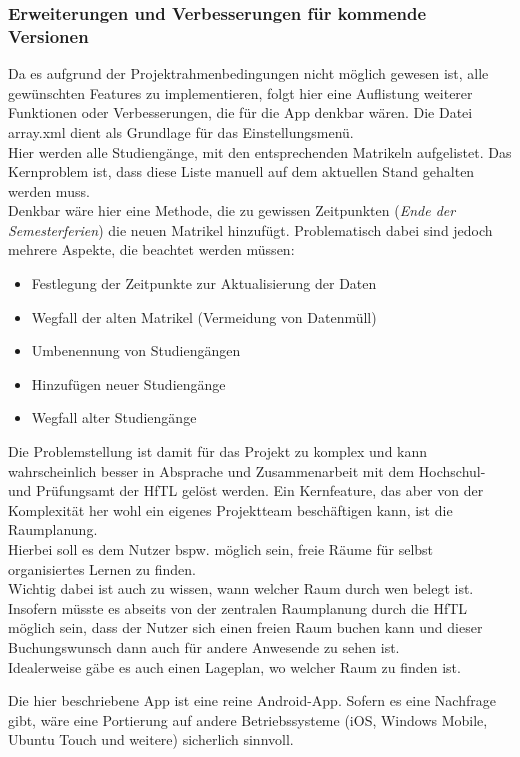 \begin{description}
\subsubsection{Erweiterungen und Verbesserungen für kommende Versionen}
Da es aufgrund der Projektrahmenbedingungen nicht möglich gewesen ist, alle gewünschten Features zu implementieren, folgt hier eine Auflistung weiterer Funktionen oder Verbesserungen, die für die App denkbar wären.
\label{pflege}
Die Datei array.xml dient als Grundlage für das Einstellungsmenü.\\
Hier werden alle Studiengänge, mit den entsprechenden Matrikeln aufgelistet. Das Kernproblem ist, dass diese Liste manuell auf dem aktuellen Stand gehalten werden muss.\\
Denkbar wäre hier eine Methode, die zu gewissen Zeitpunkten (\textit{Ende der Semesterferien}) die neuen Matrikel hinzufügt. Problematisch dabei sind jedoch mehrere Aspekte, die beachtet werden müssen:
\begin{itemize}
\item Festlegung der Zeitpunkte zur Aktualisierung der Daten
\item Wegfall der alten Matrikel (Vermeidung von Datenmüll)
\item Umbenennung von Studiengängen
\item Hinzufügen neuer Studiengänge
\item Wegfall alter Studiengänge
\end{itemize}
Die Problemstellung ist damit für das Projekt zu komplex und kann wahrscheinlich besser in Absprache und Zusammenarbeit mit dem Hochschul- und Prüfungsamt der HfTL  gelöst werden.
Ein Kernfeature, das aber von der Komplexität her wohl ein eigenes Projektteam beschäftigen kann, ist die Raumplanung.\\
Hierbei soll es dem Nutzer bspw. möglich sein, freie Räume für selbst organisiertes Lernen zu finden.\\ Wichtig dabei ist auch zu wissen, wann welcher Raum durch wen belegt ist. Insofern müsste es abseits von der zentralen Raumplanung durch die HfTL möglich sein, dass der Nutzer sich einen freien Raum buchen kann und dieser Buchungswunsch dann auch für andere Anwesende zu sehen ist.\\
Idealerweise gäbe es auch einen Lageplan, wo welcher Raum zu finden ist.

Die hier beschriebene App ist eine reine Android-App. Sofern es eine Nachfrage gibt, wäre eine Portierung auf andere Betriebssysteme (iOS, Windows Mobile, Ubuntu Touch und weitere) sicherlich sinnvoll.


\end{description}
